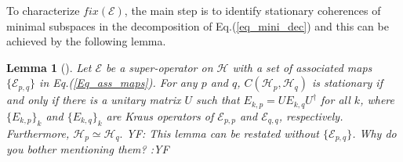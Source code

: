 \documentclass[journal]{IEEEtran}
\def\h{\ensuremath{\mathcal{H}}}
\def\e{\ensuremath{\mathcal{E}}}
\newtheorem{lemma}{Lemma}
\newcommand{\authorComment}[3]{\color{#1}#2: {#3} :#2\color{black}}
\newcommand{\yf}[1]{\authorComment{blue}{YF}{#1}}
\begin{document}
To characterize $fix(\e)$, the main step is to identify stationary coherences of minimal subspaces in  the decomposition of Eq.(\ref{eq_mini_dec}) and this can be achieved  by the following lemma.

\begin{lemma}[\cite{baumgartner2012structure}]\label{Lem_SC}
  Let $\e$ be a super-operator on $\h$ with a set of associated maps $\{\e_{p,q}\}$ in Eq.(\ref{Eq_ass_maps}). For any $p$ and $q$,  $C(\h_p,\h_q)$ is stationary if and only if there is a unitary matrix $U$ such that 
  $E_{k,p}=UE_{k,q}U^\dagger$ for all $k$, where $\{E_{k,p}\}_k$ and $\{E_{k,q}\}_k$ are Kraus operators of $\e_{p,p}$ and $\e_{q,q}$, respectively.  Furthermore, $\h_p\simeq\h_q.$
    \yf{This lemma can be restated without $\{\e_{p,q}\}$. Why do you bother mentioning them?}
\end{lemma}
\end{document}
